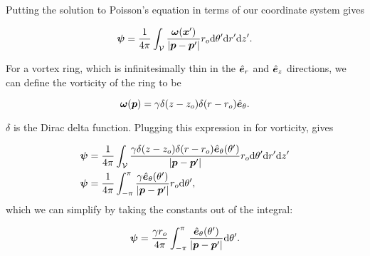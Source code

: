 Putting the solution to Poisson's equation in terms of our coordinate system gives

\begin{equation}
    \label{eqn:psi2}
    \bm{\psi} = \frac{1}{4\pi} \int_{\mathcal{V}} \frac{\bm{\omega}(\bm{x}')}{|\bm{p}-\bm{p}'|} r_o \mathrm{d}\theta' \mathrm{d}{r'} \mathrm{d}{z'}.
\end{equation}

For a vortex ring, which is infinitesimally thin in the \(\hat{\bm{e}}_r\) and \(\hat{\bm{e}}_z\) directions, we can define the vorticity of the ring to be

\begin{equation}
    \bm{\omega}(\bm{p}) = \gamma \delta(z-z_o) \delta(r-r_o) \hat{\bm{e}}_\theta.
\end{equation}

\where \(\delta\) is the Dirac delta function.
%
Plugging this expression in for vorticity, gives

\begin{equation}
    \label{eqn:psi3}
    \begin{aligned}
        \bm{\psi} &= \frac{1}{4\pi} \int_{\mathcal{V}} \frac{\gamma \delta(z-z_o) \delta(r-r_o) \hat{\bm{e}}_\theta(\theta')}{|\bm{p}-\bm{p}'|} r_o \mathrm{d}\theta' \mathrm{d}{r'} \mathrm{d}{z'} \\
        \bm{\psi} &= \frac{1}{4\pi} \int_{-\pi}^{\pi} \frac{\gamma \hat{\bm{e}}_\theta(\theta')}{|\bm{p}-\bm{p}'|}r_o \mathrm{d}\theta',
    \end{aligned}
\end{equation}
%
which we can simplify by taking the constants out of the integral:

\begin{equation}
    \label{eqn:psi4}
    \bm{\psi} = \frac{\gamma r_o}{4\pi} \int_{-\pi}^{\pi} \frac{ \hat{\bm{e}}_\theta(\theta')}{|\bm{p}-\bm{p}'|} \mathrm{d}\theta'.
\end{equation}

